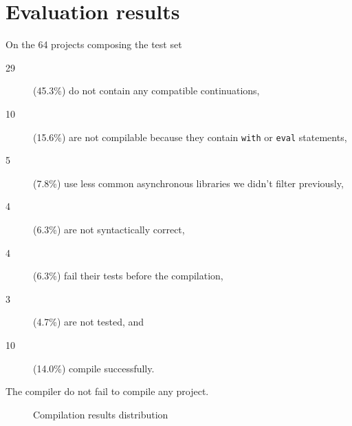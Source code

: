\appendix

\section{Evaluation results} \label{section:results}

On the 64 projects composing the test set
\begin{description}
\item[29] (45.3\%) do not contain any compatible continuations,
\item[10] (15.6\%) are not compilable because they contain \texttt{with} or \texttt{eval} statements,
\item[5] (7.8\%) use less common asynchronous libraries we didn't filter previously,
\item[4] (6.3\%) are not syntactically correct,
\item[4] (6.3\%) fail their tests before the compilation,
\item[3] (4.7\%) are not tested, and
\item[10] (14.0\%) compile successfully.
\end{description}
The compiler do not fail to compile any project.

\begin{figure}[h!]
\caption{Compilation results distribution}
\end{figure}

